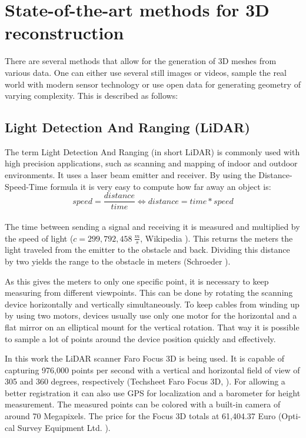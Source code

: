 \section{State-of-the-art methods for 3D reconstruction}

There are several methods that allow for the generation of 3D meshes from various data. One can either use several still images or videos, sample the real world with modern sensor technology or use open data for generating geometry of varying complexity. This is described as follows:

\subsection{Light Detection And Ranging (LiDAR)}

The term Light Detection And Ranging (in short LiDAR) is commonly used with high precision applications, such as scanning and mapping of indoor and outdoor environments. It uses a laser beam emitter and receiver. By using the Distance-Speed-Time formula it is very easy to compute how far away an object is:\\

$$  speed = \dfrac{distance}{time} \Longleftrightarrow distance = time * speed $$\\
The time between sending a signal and receiving it is measured and multiplied by the speed of light ($c = 299,792,458 \medspace \frac{m}{s}$, Wikipedia \parencite{wiki:SpeedOfLight}). This returns the meters the light traveled from the emitter to the obstacle and back. Dividing this distance by two yields the range to the obstacle in meters (Schroeder \parencite[see][p8-9]{dp_lidar}).

As this gives the meters to only one specific point, it is necessary to keep measuring from different viewpoints. This can be done by rotating the scanning device horizontally and vertically simultaneously. To keep cables from winding up by using two motors, devices usually use only one motor for the horizontal and a flat mirror on an elliptical mount for the vertical rotation. That way it is possible to sample a lot of points around the device position quickly and effectively.

In this work the LiDAR scanner Faro Focus 3D is being used. It is capable of capturing 976,000 points per second with a vertical and horizontal field of view of 305 and 360 degrees, respectively (Techsheet Faro Focus 3D, \parencite{faro_techsheet}). For allowing a better registration it can also use GPS for localization and a barometer for height measurement. The measured points can be colored with a built-in camera of around 70 Megapixels. The price for the Focus 3D totals at 61,404.37 Euro (Opti-cal Survey Equipment Ltd. \parencite{survey_equipment}).

